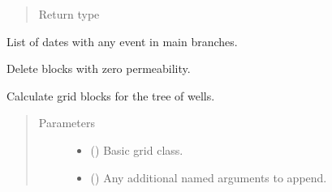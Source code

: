 \documentclass[letterpaper,10pt,english]{sphinxmanual}
\begin{document}
\begin{fulllineitems}
\begin{fulllineitems}
\begin{quote}
\begin{description}
\item[{Return type}] \leavevmode
{\hyperref[\detokenize{api/base_classes:geology.src.base_component.BaseComponent}]{}}

\end{description}\end{quote}

\end{fulllineitems}


\begin{fulllineitems}
\label{\detokenize{api/wells:geology.src.wells.Wells.event_dates}}
List of dates with any event in main branches.

\end{fulllineitems}


\begin{fulllineitems}
\label{\detokenize{api/wells:geology.src.wells.Wells.filter_blocks_with_perm}}
Delete blocks with zero permeability.

\end{fulllineitems}


\begin{fulllineitems}
\label{\detokenize{api/wells:geology.src.wells.Wells.get_wellblocks}}
Calculate grid blocks for the tree of wells.
\begin{quote}\begin{description}
\item[{Parameters}] \leavevmode\begin{itemize}
\item {} 
 () \textendash{} Basic grid class.

\item {} 
 () \textendash{} Any additional named arguments to append.


\end{itemize}
\end{description}
\end{quote}
\end{fulllineitems}
\end{fulllineitems}
\end{document}
